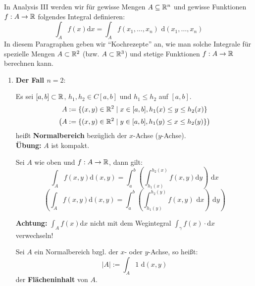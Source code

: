 \documentclass[a4paper,twoside,DIV15,BCOR12mm,chapterprefix=true,headings=twolinechapter]{scrbook}
\begin{document}
In Analysis III werden wir für gewisse Mengen $A\subseteq\mathbb{R}^n$ und gewisse Funktionen
$f:A\to\mathbb{R}$ folgendes Integral definieren:
\[\int_A f(x)\text{d}x=\int_A f(x_1,\ldots,x_n)\text{ d}(x_1,\ldots,x_n)\]
In diesem Paragraphen geben wir "`Kochrezepte"' an, wie man solche Integrale
für spezielle Mengen $A\subset\mathbb{R}^2$ (bzw. $A\subset\mathbb{R}^3$) und stetige Funktionen
$f:A\to\mathbb{R}$ berechnen kann.

\renewcommand{\theenumi}{\Roman{enumi}}
\renewcommand{\labelenumi}{\theenumi}

\begin{enumerate}
\item \textbf{Der Fall $n=2$}:\\
\begin{definition*}
Es sei $[a,b]\subset\mathbb{R}$, $h_1,h_2\in C[a,b]$ und $h_1\le h_2$ auf $[a,b]$.
\[A:=\{(x,y)\in\mathbb{R}^2\mid x\in[a,b],h_1(x)\le y\le h_2(x)\}\]
\[\left(A:=\{(x,y)\in\mathbb{R}^2\mid y\in[a,b],h_1(y)\le x\le h_2(y)\}\right)\]
heißt \textbf{Normalbereich} bezüglich der $x$-Achse ($y$-Achse).\\
\textbf{Übung:} $A$ ist kompakt.
\end{definition*}

\begin{satz}
Sei $A$ wie oben und $f:A\to\mathbb{R}$, dann gilt:
\[\int_A f(x,y)\text{d}(x,y)=\int_a^b\left(\int_{h_1(x)}^{h_2(x)} f(x,y)\text{d}y\right)\text{ d}x\]
\[\left(\int_A f(x,y)\text{d}(x,y)=\int_a^b\left(\int_{h_1(y)}^{h_2(y)} f(x,y)\text{ d}x\right)\text{ d}y\right)\]
\end{satz}

\textbf{Achtung:} $\int_A f(x)\text{d}x$ nicht mit dem Wegintegral $\int_\gamma f(x)\cdot\text{d}x$
verwechseln!

\begin{definition*}
Sei $A$ ein Normalbereich bzgl. der $x$- oder $y$-Achse, so heißt:
\[|A|:=\int_A 1\text{ d}(x,y)\]
der \textbf{Flächeninhalt} von $A$.
\end{definition*}


\end{enumerate}
\end{document}
